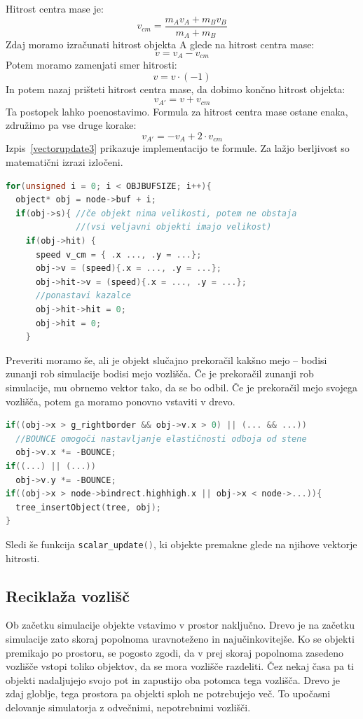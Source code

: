 \documentclass[a4paper,12pt]{article}
\begin{document}
Hitrost centra mase je: 
\[
v_{cm} = \frac{m_A v_A + m_B v_B}{m_A + m_B}
\]
Zdaj moramo izračunati hitrost objekta A glede na hitrost centra mase:
\[
v = v_A - v_{cm}
\]
Potem moramo zamenjati smer hitrosti:
\[
v = v\cdot(-1)
\]
In potem nazaj prišteti hitrost centra mase, da dobimo končno hitrost objekta:
\[
v_{A'} = v + v_{cm}
\]
Ta postopek lahko poenostavimo. Formula za hitrost centra mase ostane enaka, združimo pa vse druge korake:
\[
v_{A'} = - v_A + 2\cdot v_{cm}
\]
\newpage
Izpis~\ref{vectorupdate3} prikazuje implementacijo te formule. Za lažjo berljivost so matematični izrazi izločeni.
\begin{lstlisting}[caption={\lstinline|vector_update()| -- Upoštevanje trkov}, label=vectorupdate3, language=C]
for(unsigned i = 0; i < OBJBUFSIZE; i++){
  object* obj = node->buf + i;
  if(obj->s){ //če objekt nima velikosti, potem ne obstaja 
              //(vsi veljavni objekti imajo velikost)
    if(obj->hit) {
      speed v_cm = { .x ..., .y = ...};
      obj->v = (speed){.x = ..., .y = ...};
      obj->hit->v = (speed){.x = ..., .y = ...};
      //ponastavi kazalce
      obj->hit->hit = 0;
      obj->hit = 0;
    }
\end{lstlisting}
Preveriti moramo še, ali je objekt slučajno prekoračil kakšno mejo -- bodisi zunanji rob simulacije
bodisi mejo vozlišča. Če je prekoračil zunanji rob simulacije, mu obrnemo vektor tako, da se bo odbil. Če je prekoračil
mejo svojega vozlišča, potem ga moramo ponovno vstaviti v drevo.
\begin{lstlisting}[caption={\lstinline|vector_update()| -- Odboji}, label=vectorupdate4, language=C]
if((obj->x > g_rightborder && obj->v.x > 0) || (... && ...))
  //BOUNCE omogoči nastavljanje elastičnosti odboja od stene
  obj->v.x *= -BOUNCE; 
if((...) || (...))
  obj->v.y *= -BOUNCE;
if((obj->x > node->bindrect.highhigh.x || obj->x < node->...)){
  tree_insertObject(tree, obj);
}
\end{lstlisting}
Sledi še funkcija \lstinline[language=C]{scalar_update()}, ki objekte premakne glede na njihove vektorje hitrosti.

\subsection{Reciklaža vozlišč}
Ob začetku simulacije objekte vstavimo v prostor naključno. Drevo je na začetku simulacije zato
skoraj popolnoma uravnoteženo in najučinkovitejše. Ko se objekti premikajo po prostoru, se pogosto zgodi,
da v prej skoraj popolnoma zasedeno vozlišče vstopi toliko objektov, da se mora vozlišče razdeliti. Čez nekaj
časa pa ti objekti nadaljujejo svojo pot in zapustijo oba potomca tega vozlišča. Drevo je zdaj globlje, 
tega prostora pa objekti sploh ne potrebujejo več. To upočasni delovanje simulatorja z odvečnimi, nepotrebnimi
vozlišči.
\end{document}
